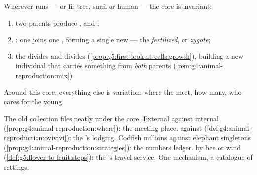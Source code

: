 \begin{proposition}\label{prop:g8:sexual-reproduction:core}
Wherever  runs ---  or fir tree,
snail or human --- the core is invariant:
\begin{enumerate}
  \item two parents produce ,  and ;
  \item \emph{}: one   joins one
         , forming a single new  --- the
        \emph{ fertilized}, or
        \emph{zygote};
  \item the  divides and divides
        (\cref{prop:g5:first-look-at-cells:growth}),
        building a new individual that carries something
        from \emph{both} parents
        (\cref{rem:g4:animal-reproduction:mix}).
\end{enumerate}
Around this core, everything else is variation: where the
 meet, how many, who cares for the young.
\end{proposition}
\admitted

\begin{example}\label{ex:g8:sexual-reproduction:variations}
The old collection files neatly under the core. External
against internal 
(\cref{prop:g4:animal-reproduction:where}): the meeting
place.  against 
(\cref{def:g4:animal-reproduction:ovivivi}): the 's
lodging. Codfish millions against elephant singletons
(\cref{prop:g4:animal-reproduction:strategies}): the
numbers ledger.  by bee or wind
(\cref{def:g5:flower-to-fruit:steps}): the  's
travel service. One mechanism, a catalogue of settings.
\end{example}

